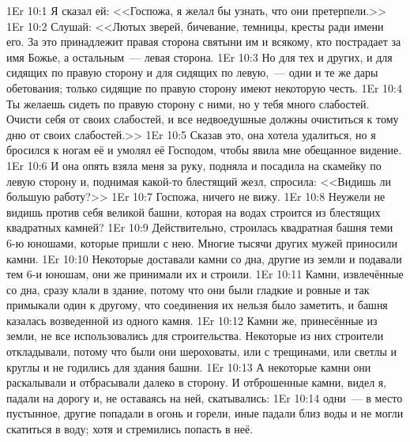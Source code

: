 \vs 1Er 10:1
Я сказал ей:
<<Госпожа, я желал бы узнать, что они претерпели.>>
\vs 1Er 10:2
Слушай:
<<Лютых зверей, бичевание, темницы, кресты ради имени его.
За это принадлежит правая сторона святыни им и всякому,
кто пострадает за имя Божье, а остальным~--- левая сторона.
\vs 1Er 10:3
Но для тех и других, и для сидящих по правую сторону
и для сидящих по левую,~--- одни и те же дары обетования;
только сидящие по правую сторону имеют некоторую честь.
\vs 1Er 10:4
Ты желаешь сидеть по правую сторону с ними,
но у тебя много слабостей.
Очисти себя от своих слабостей,
и все недвоедушные должны очиститься к тому дню от своих слабостей.>>
\vs 1Er 10:5
Сказав это, она хотела удалиться, но я бросился к ногам её
и умолял её Господом, чтобы явила мне обещанное видение.
\vs 1Er 10:6
И она опять взяла меня за руку,
подняла и посадила на скамейку по левую сторону и,
поднимая какой-то блестящий жезл, спросила:
<<Видишь ли большую работу?>>
\vs 1Er 10:7
Госпожа, ничего не вижу.
\vs 1Er 10:8
Неужели не видишь против себя великой башни,
которая на водах строится из блестящих квадратных камней?
\vs 1Er 10:9
Действительно, строилась квадратная башня теми 6-ю юношами,
которые пришли с нею.
Многие тысячи других мужей приносили камни.
\vs 1Er 10:10
Некоторые доставали камни со дна,
другие из земли и подавали тем 6-и юношам,
они же принимали их и строили.
\vs 1Er 10:11
Камни, извлечённые со дна, сразу клали в здание,
потому что они были гладкие и ровные и так примыкали один к другому,
что соединения их нельзя было заметить,
и башня казалась возведенной из одного камня.
\vs 1Er 10:12
Камни же, принесённые из земли,
не все использовались для строительства.
Некоторые из них строители откладывали,
потому что были они шероховаты,
или с трещинами, или светлы и круглы
и не годились для здания башни.
\vs 1Er 10:13
А некоторые камни они раскалывали и отбрасывали далеко в сторону.
И отброшенные камни, видел я, падали на дорогу и,
не оставаясь на ней, скатывались:
\vs 1Er 10:14
одни~--- в место пустынное,
другие попадали в огонь и горели,
иные падали близ воды и не могли скатиться в воду;
хотя и стремились попасть в неё.

